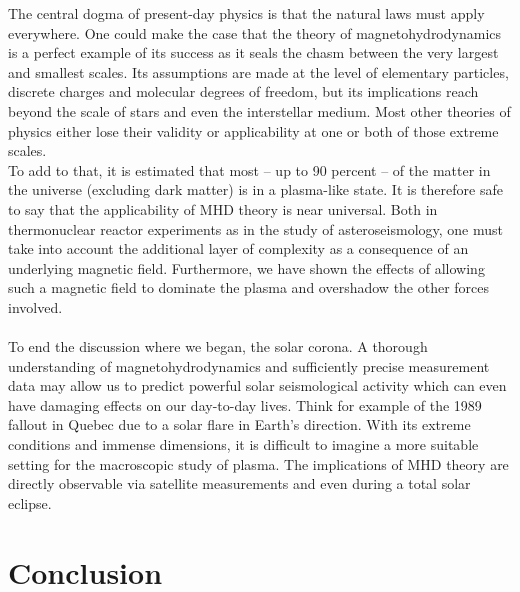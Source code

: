 The central dogma of present-day physics is that the natural laws must apply everywhere. 
One could make the case that the theory of magnetohydrodynamics is a perfect example of its success as it seals the chasm between the very largest and smallest scales. 
Its assumptions are made at the level of elementary particles, discrete charges and molecular degrees of freedom, but its implications reach beyond the scale of stars and even the interstellar medium. 
Most other theories of physics either lose their validity or applicability at one or both of those extreme scales.\\

To add to that, it is estimated that most – up to 90 percent \cite{notes-principles-MHD}– of the matter in the universe (excluding dark matter) is in a plasma-like state. 
It is therefore safe to say that the applicability of MHD theory is near universal. 
Both in thermonuclear reactor experiments as in the study of asteroseismology, one must take into account the additional layer of complexity as a consequence of an underlying magnetic field. 
Furthermore, we have shown the effects of allowing such a magnetic field to dominate the plasma and overshadow the other forces involved.\\ 
\\
To end the discussion where we began, the solar corona. 
A thorough understanding of magnetohydrodynamics and sufficiently precise measurement data may allow us to predict powerful solar seismological activity which can even have damaging effects on our day-to-day lives. 
Think for example of the 1989 fallout in Quebec due to a solar flare in Earth’s direction. 
With its extreme conditions and immense dimensions, it is difficult to imagine a more suitable setting for the macroscopic study of plasma. 
The implications of MHD theory are directly observable via satellite measurements and even during a total solar eclipse.

\section{Conclusion}

